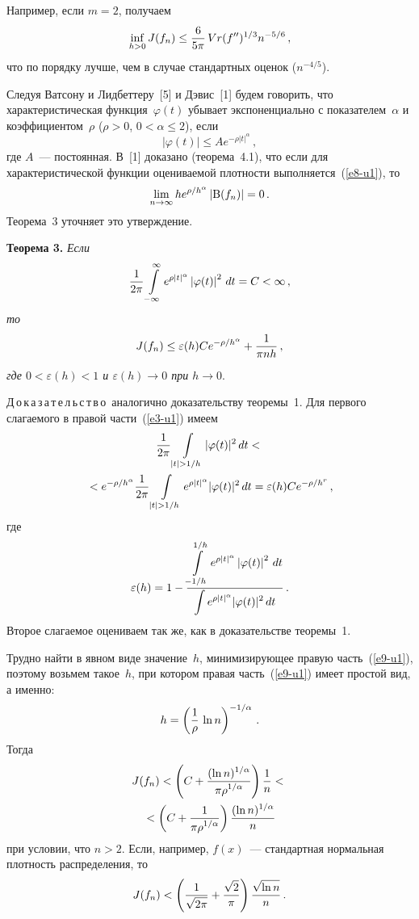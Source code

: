 \begin{multicols}{2}
\smallskip
Например, если $m=2$, получаем
$$
\inf\limits_{h>0}J(f_n)\le\displaystyle\frac{\displaystyle 6\mathstrut}{\displaystyle 5\pi\mathstrut}\,Vr(f'')^{1/3}n^{-5/6}\,,
$$
что по порядку лучше, чем в случае стандартных оценок ($n^{-4/5}$).

Следуя Ватсону и Лидбеттеру~[5] и Дэвис~[1] будем говорить, что
характеристическая функция~$\varphi(t)$ убывает экспоненциально с показателем~$\alpha$ 
и коэффициентом~$\rho$ ($\rho>0$, $0<\alpha\le2$), если
\begin{equation}
\left\vert\varphi(t)\right\vert \le Ae^{-\rho|t|^\alpha}\,,
\label{e8-u1}
\end{equation}
где $A$~--- постоянная. В~[1] доказано (теорема~4.1), что если для
характеристической функции оцениваемой плотности выполняется~(\ref{e8-u1}),
то
$$
\lim\limits_{n\to\infty}he^{\rho/h^\alpha}\left\vert{\rm B}(f_n)\right\vert=0\,.
$$
Теорема~3 уточняет это утверждение.

\smallskip

\noindent
\textbf{Теорема 3.} \textit{Если}
$$
\displaystyle\frac{\displaystyle 1\mathstrut}{\displaystyle 2\pi\mathstrut}\int\limits_{-\infty}^\infty e^{\rho|t|^\alpha}\left\vert\varphi(t)\right\vert^2\,dt
=C<\infty\,,
$$
\textit{то}
\begin{equation}
J(f_n)\le\varepsilon(h)Ce^{-\rho/h^\alpha}+\displaystyle\frac{\displaystyle 1\mathstrut}{\displaystyle \pi nh\mathstrut}\,,
\label{e9-u1}
\end{equation}
\textit{где $0<\varepsilon(h)<1$ и $\varepsilon(h)\to0$ при $h\to0$}.



\noindent
Д\,о\,к\,а\,з\,а\,т\,е\,л\,ь\,с\,т\,в\,о\ аналогично доказательству\linebreak
теоремы~1.
Для первого слагаемого в правой час\-ти~(\ref{e3-u1}) имеем
\begin{multline*}
\fr{1}{2\pi}\int\limits_{|t|>1/h}|\varphi(t)|^2\,dt<{}\\
{}<
e^{-\rho/h^\alpha}\fr{1}{2\pi}
\int\limits_{|t|>1/h}e^{\rho|t|^\alpha}|\varphi(t)|^2\,dt
=\varepsilon(h)Ce^{-\rho/h^r}\,,
\end{multline*}
где
$$
\varepsilon(h)= 1-\displaystyle\frac{\displaystyle \int\limits_{-1/h}^{1/h}e^{\rho|t|^\alpha}\left\vert\varphi(t)\right\vert^2\,dt\mathstrut}{\displaystyle \int e^{\rho|t|^\alpha}|\varphi(t)|^2\,dt\mathstrut}\,.
$$
Второе слагаемое оцениваем так же, как в доказательстве теоремы~1.

Трудно найти в явном виде значение~$h$, минимизирующее правую часть~(\ref{e9-u1}), 
поэтому возьмем такое~$h$, при котором правая часть~(\ref{e9-u1}) имеет
простой вид, а именно:
$$
h=\left(\displaystyle\frac{\displaystyle 1\mathstrut}{\displaystyle \rho\mathstrut}\,\ln n\right)^{-1/\alpha}\,.
$$
Тогда
\begin{multline*}
J(f_n)< \left(C+\displaystyle\frac{\displaystyle (\ln n)^{1/\alpha}\mathstrut}{\displaystyle \pi\rho^{1/\alpha}\mathstrut}\right)\displaystyle\frac{\displaystyle 1\mathstrut}{\displaystyle n\mathstrut}<{}\\
{}<
\left(C+\displaystyle\frac{\displaystyle 1\mathstrut}{\displaystyle \pi\rho^{1/\alpha}\mathstrut}\right)\displaystyle\frac{\displaystyle (\ln n)^{1/\alpha}\mathstrut}{\displaystyle n\mathstrut}
\end{multline*}
при условии, что $n>2$. Если, например, $f(x)$~--- стандартная нормальная
плотность распределения, то
$$
J(f_n)< \left(\displaystyle\frac{\displaystyle 1\mathstrut}{\displaystyle \sqrt{2\pi}\mathstrut}+ \displaystyle\frac{\displaystyle \sqrt 2\mathstrut}{\displaystyle \pi\mathstrut}\right)\displaystyle\frac{\displaystyle \sqrt{\ln
n}\mathstrut}{\displaystyle n\mathstrut}\,.
$$


\end{multicols}
